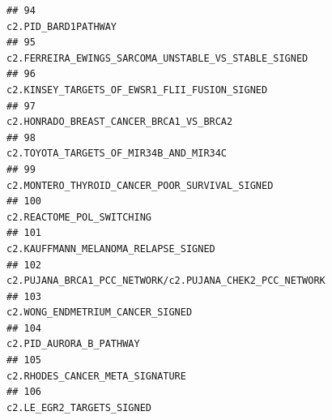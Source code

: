 \documentclass{article}\usepackage[]{graphicx}\usepackage[]{color}
\makeatletter
\newenvironment{kframe}{%
 \def\at@end@of@kframe{}%
 \ifinner\ifhmode%
  \def\at@end@of@kframe{\end{minipage}}%
  \begin{minipage}{\columnwidth}%
 \fi\fi%
 \def\FrameCommand##1{\hskip\@totalleftmargin \hskip-\fboxsep
 \colorbox{shadecolor}{##1}\hskip-\fboxsep
     \hskip-\linewidth \hskip-\@totalleftmargin \hskip\columnwidth}%
 \MakeFramed {\advance\hsize-\width
   \@totalleftmargin\z@ \linewidth\hsize
   \@setminipage}}%
 {\par\unskip\endMakeFramed%
 \at@end@of@kframe}
\newenvironment{knitrout}{}{} %
\makeatother
\begin{document}
\begin{knitrout}
\begin{kframe}
\begin{verbatim}
## 94                                                                                                                                                                                               c2.PID_BARD1PATHWAY
## 95                                                                                                                                                              c2.FERREIRA_EWINGS_SARCOMA_UNSTABLE_VS_STABLE_SIGNED
## 96                                                                                                                                                                     c2.KINSEY_TARGETS_OF_EWSR1_FLII_FUSION_SIGNED
## 97                                                                                                                                                                           c2.HONRADO_BREAST_CANCER_BRCA1_VS_BRCA2
## 98                                                                                                                                                                            c2.TOYOTA_TARGETS_OF_MIR34B_AND_MIR34C
## 99                                                                                                                                                                    c2.MONTERO_THYROID_CANCER_POOR_SURVIVAL_SIGNED
## 100                                                                                                                                                                                        c2.REACTOME_POL_SWITCHING
## 101                                                                                                                                                                             c2.KAUFFMANN_MELANOMA_RELAPSE_SIGNED
## 102                                                                                                                                                          c2.PUJANA_BRCA1_PCC_NETWORK/c2.PUJANA_CHEK2_PCC_NETWORK
## 103                                                                                                                                                                                 c2.WONG_ENDMETRIUM_CANCER_SIGNED
## 104                                                                                                                                                                                          c2.PID_AURORA_B_PATHWAY
## 105                                                                                                                                                                                  c2.RHODES_CANCER_META_SIGNATURE
## 106                                                                                                                                                                                        c2.LE_EGR2_TARGETS_SIGNED

\end{verbatim}
\end{kframe}
\end{knitrout}
\end{document}
